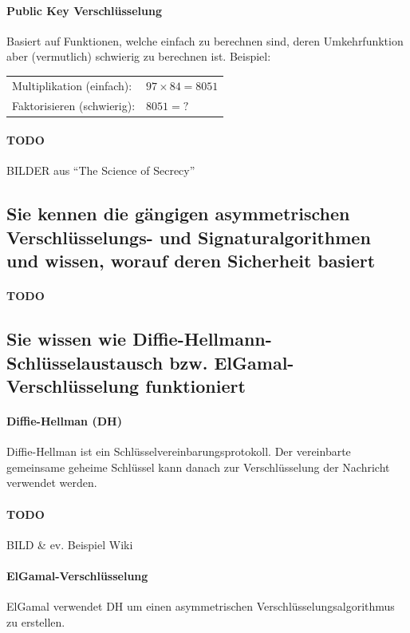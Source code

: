 \documentclass[10pt,a4paper]{article}
\begin{document}
\paragraph*{Public Key Verschlüsselung}Basiert auf Funktionen, welche einfach zu berechnen sind, deren Umkehrfunktion aber (vermutlich) schwierig zu berechnen ist.
Beispiel:\newline %
\noindent
\begin{tabular}{|ll|}
    \hline
    Multiplikation (einfach):&$97\times84=8051$\\
    Faktorisieren (schwierig):&$8051=?$\\
    \hline
\end{tabular}

\paragraph*{TODO}BILDER aus "`The Science of Secrecy"'
\subsection*{Sie kennen die gängigen asymmetrischen Verschlüsselungs- und Signaturalgorithmen und wissen, worauf deren Sicherheit basiert}
\paragraph*{TODO}


\subsection*{Sie wissen wie Diffie-Hellmann-Schlüsselaustausch bzw. ElGamal-Verschlüsselung funktioniert}

\paragraph*{Diffie-Hellman (DH)}Diffie-Hellman ist ein Schlüsselvereinbarungsprotokoll. Der vereinbarte gemeinsame geheime Schlüssel kann danach zur Verschlüsselung der Nachricht verwendet werden.

\paragraph*{TODO}BILD \& ev. Beispiel Wiki

\paragraph*{ElGamal-Verschlüsselung}ElGamal verwendet DH um einen asymmetrischen Verschlüsselungsalgorithmus zu erstellen.
\end{document}

